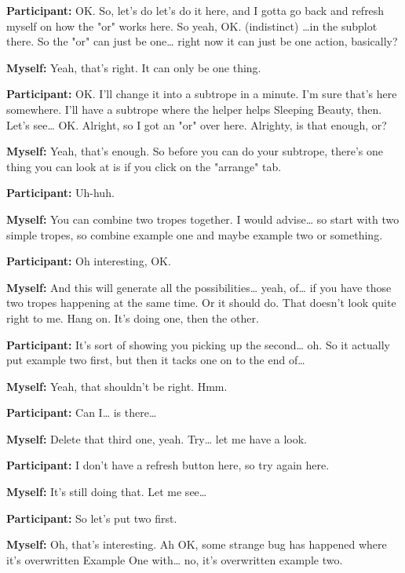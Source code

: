 \documentclass[11pt]{report}
\begin{document}
\begin{linenumbers}
\textbf{Participant:} OK. So, let's do let's do it here, and I gotta go back and
refresh myself on how the "or" works here. So yeah, OK. (indistinct) \ldots{}in
the subplot there. So the "or" can just be one\ldots{} right now it can just be
one action, basically?

\textbf{Myself:} Yeah, that's right. It can only be one thing.

\textbf{Participant:} OK. I'll change it into a subtrope in a minute. I'm sure that's here somewhere. I'll have a subtrope where the helper helps Sleeping Beauty, then. Let's see\ldots{} OK. Alright, so I got an "or" over here. Alrighty, is that enough, or?

\textbf{Myself:} Yeah, that's enough. So before you can do your subtrope, there's one thing you can look at is if you click on the "arrange" tab.

\textbf{Participant:} Uh-huh.

\textbf{Myself:} You can combine two tropes together. I would advise\ldots{} so start with two simple tropes, so combine example one and maybe example two or something.

\textbf{Participant:} Oh interesting, OK.

\textbf{Myself:} And this will generate all the possibilities\ldots{} yeah, of\ldots{} if you have those two tropes happening at the same time. Or it should do. That doesn't look quite right to me. Hang on. It's doing one, then the other.

\textbf{Participant:} It's sort of showing you picking up the second\ldots{} oh. So it actually put example two first, but then it tacks one on to the end of\ldots{}

\textbf{Myself:} Yeah, that shouldn't be right. Hmm.

\textbf{Participant:} Can I\ldots{} is there\ldots{}

\textbf{Myself:} Delete that third one, yeah. Try\ldots{} let me have a look.

\textbf{Participant:} I don't have a refresh button here, so try again here.

\textbf{Myself:} It's still doing that. Let me see\ldots{}

\textbf{Participant:} So let's put two first.

\textbf{Myself:} Oh, that's interesting. Ah OK, some strange bug has happened where it's overwritten Example One with\ldots{} no, it's overwritten example two.


\end{linenumbers}
\end{document}
